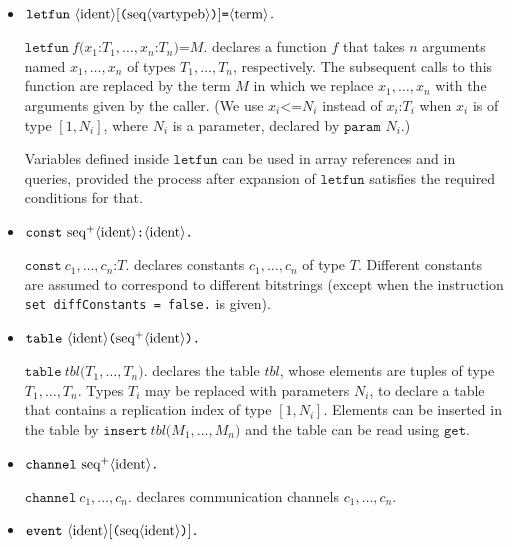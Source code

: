 \begin{itemize}
\begin{itemize}
\end{itemize}

\item $\texttt{letfun}\
  \langle\textrm{ident}\rangle[\texttt{(}\textrm{seq}\langle\textrm{vartypeb}\rangle\texttt{)}]\texttt{=}\langle\textrm{term}\rangle\texttt{.}$ 

  $\texttt{letfun}\ f\texttt{(} x_1\texttt{:} T_1, \ldots,
  x_n\texttt{:}T_n\texttt{)=} M\texttt{.}$
  declares a function $f$ that takes $n$ arguments named
  $x_1, \ldots, x_n$ of types $T_1, \ldots, T_n$, respectively. The
  subsequent calls to this function are replaced by the term $M$ in
  which we replace $x_1, \ldots, x_n$ with the arguments given by the
  caller. (We use $x_i \texttt{<=} N_i$ instead of
  $x_i\texttt{:} T_i$ when $x_i$ is of type $[1,N_i]$, where $N_i$ is
  a parameter, declared by $\texttt{param }N_i$.)

  Variables defined inside $\texttt{letfun}$ can be used in array references
  and in queries, provided the process after expansion of $\texttt{letfun}$
  satisfies the required conditions for that.

\item $\texttt{const}\ \neseq{ident}\texttt{:}\nonterm{ident}\texttt{.}$

$\texttt{const}\ c_1, \ldots, c_n\texttt{:}T\texttt{.}$ declares constants
$c_1, \ldots, c_n$ of type $T$.
Different constants are assumed to correspond to different bitstrings
(except when the instruction \texttt{set diffConstants = false.} is
given).

\item $\texttt{table}\ \nonterm{ident}\texttt{(}\neseq{ident}\texttt{).}$

$\texttt{table}\ \mathit{tbl}\texttt{(}T_1, \ldots, T_n\texttt{).}$
declares the table $\mathit{tbl}$, whose elements are tuples of
type $T_1, \ldots, T_n$. Types $T_i$ may be replaced with
parameters $N_i$, to declare a table that contains
a replication index of type $[1,N_i]$. Elements can be inserted in the table
by $\texttt{insert}\ \mathit{tbl}\texttt{(}M_1, \ldots, M_n\texttt{)}$
and the table can be read using $\texttt{get}$.

\ifchannels
\item $\texttt{channel}\ \neseq{ident}\texttt{.}$

$\texttt{channel}\ c_1, \ldots, c_n\texttt{.}$ declares communication channels
$c_1, \ldots, c_n$.
\fi

\item $\texttt{event}\ \nonterm{ident}[\texttt{(}\seq{ident}\texttt{)}]\texttt{.}$


\end{itemize}
